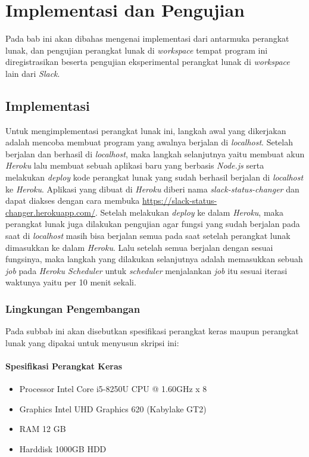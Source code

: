 \chapter{Implementasi dan Pengujian}
\label{chap:implementasi dan pengujian}

Pada bab ini akan dibahas mengenai implementasi dari antarmuka perangkat lunak, dan pengujian perangkat lunak di \textit{workspace} tempat program ini diregistrasikan beserta pengujian eksperimental perangkat lunak di \textit{workspace} lain dari \textit{Slack}.

\section{Implementasi}
 Untuk mengimplementasi perangkat lunak ini, langkah awal yang dikerjakan adalah mencoba membuat program yang awalnya berjalan di \textit{localhost}. Setelah berjalan dan berhasil di \textit{localhost}, maka langkah selanjutnya yaitu membuat akun \textit{Heroku} lalu membuat sebuah aplikasi baru yang berbasis \textit{Node.js} serta melakukan \textit{deploy} kode perangkat lunak yang sudah berhasil berjalan di \textit{localhost} ke \textit{Heroku}. Aplikasi yang dibuat di \textit{Heroku} diberi nama \textit{slack-status-changer} dan dapat diakses dengan cara membuka \url{https://slack-status-changer.herokuapp.com/}. Setelah melakukan \textit{deploy} ke dalam \textit{Heroku}, maka perangkat lunak juga dilakukan pengujian agar fungsi yang sudah berjalan pada saat di \textit{localhost} masih bisa berjalan semua pada saat setelah perangkat lunak dimasukkan ke dalam \textit{Heroku}. Lalu setelah semua berjalan dengan sesuai fungsinya, maka langkah yang dilakukan selanjutnya adalah memasukkan sebuah \textit{job} pada \textit{Heroku Scheduler} untuk \textit{scheduler} menjalankan \textit{job} itu sesuai iterasi waktunya yaitu per 10 menit sekali. 
 
\subsection{Lingkungan Pengembangan}
 Pada subbab ini akan disebutkan spesifikasi perangkat keras maupun perangkat lunak yang dipakai untuk menyusun skripsi ini:
\subsubsection{Spesifikasi Perangkat Keras}
\begin{itemize}
    \item Processor Intel Core i5-8250U CPU @ 1.60GHz x 8 
    \item Graphics Intel UHD Graphics 620 (Kabylake GT2)
    \item RAM 12 GB
    \item Harddisk 1000GB HDD
\end{itemize}
